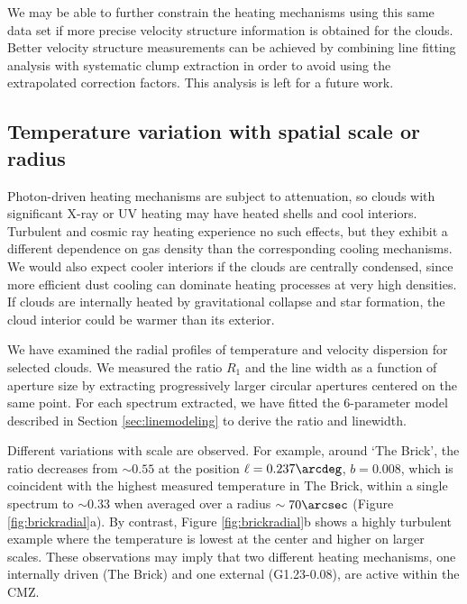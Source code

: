We may be able to further constrain the heating mechanisms using this same data
set if more precise velocity structure information is obtained for the clouds.
Better velocity structure measurements can be achieved by combining line
fitting analysis with systematic clump extraction in order to avoid using the
extrapolated correction factors.  This analysis is left for a future work.



\subsection{Temperature variation with spatial scale or radius}
Photon-driven heating mechanisms are subject to attenuation, so clouds with
significant X-ray or UV heating may have heated shells and cool interiors.
Turbulent and cosmic ray heating experience no such effects, but they exhibit a
different dependence on gas density than the corresponding cooling mechanisms.
We would also expect cooler interiors if the clouds are centrally condensed, since
more efficient dust cooling can dominate heating processes at very high
densities.  If clouds are internally heated by gravitational collapse and star
formation, the cloud interior could be warmer than its exterior.  

We have examined the radial profiles of temperature and velocity
dispersion for selected clouds.  We measured the ratio $R_1$ and the line width
as a function of aperture size by extracting progressively larger circular
apertures centered on the same point.  For each spectrum extracted, we have
fitted the 6-parameter model described in Section \ref{sec:linemodeling} to
derive the ratio and linewidth.

Different variations with scale are observed.  For example, around `The Brick',
the ratio decreases from $\sim0.55$ at the position $\ell=0.237\arcdeg$,
$b=0.008$, which is coincident with the highest measured temperature in The
Brick, within a single spectrum to $\sim0.33$ when averaged over a radius
$\sim70\arcsec$ (Figure \ref{fig:brickradial}a).  By contrast, Figure
\ref{fig:brickradial}b shows a highly turbulent example where the temperature
is lowest at the center and higher on larger scales.  
These observations may imply that two different heating mechanisms, one
internally driven (The Brick) and one external (G1.23-0.08), are active within
the CMZ.


